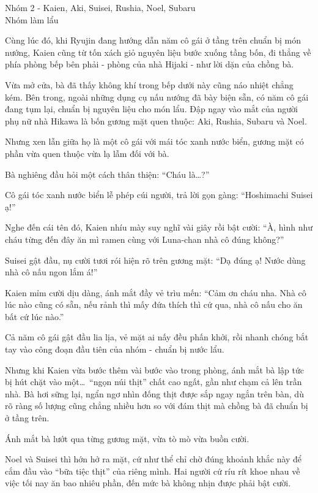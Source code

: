 \documentclass[../main.tex]{subfiles}
\begin{document}
\begin{center}
    {\color{T2} Nhóm 2 - Kaien, Aki, Suisei, Rushia, Noel, Subaru\\Nhóm làm lẩu}
\end{center}

Cùng lúc đó, khi Ryujin đang hướng dẫn năm cô gái ở tầng trên chuẩn bị món nướng, Kaien cũng từ tốn xách giỏ nguyên liệu bước xuống tầng bốn, đi thẳng về phía phòng bếp bên phải - phòng của nhà Hijaki - như lời dặn của chồng bà.

Vừa mở cửa, bà đã thấy không khí trong bếp dưới này cũng náo nhiệt chẳng kém. Bên trong, ngoài những dụng cụ nấu nướng đã bày biện sẵn, có năm cô gái đang tụm lại, chuẩn bị nguyên liệu cho món lẩu. Đập ngay vào mắt của người phụ nữ nhà Hikawa là bốn gương mặt quen thuộc: Aki, Rushia, Subaru và Noel.

Nhưng xen lẫn giữa họ là một cô gái với mái tóc xanh nước biển, gương mặt có phần vừa quen thuộc vừa lạ lẫm đối với bà.

Bà nghiêng đầu hỏi một cách thân thiện: ``Cháu là\dots?''

Cô gái tóc xanh nước biển lễ phép cúi người, trả lời gọn gàng: ``Hoshimachi Suisei ạ!''

Nghe đến cái tên đó, Kaien nhíu mày suy nghĩ vài giây rồi bật cười: ``À, hình như cháu từng đến đây ăn mì ramen cùng với Luna-chan nhà cô  đúng không?''

Suisei gật đầu, nụ cười tươi rói hiện rõ trên gương mặt: ``Dạ đúng ạ! Nước dùng nhà cô nấu ngon lắm á!''

Kaien mỉm cười dịu dàng, ánh mắt đầy vẻ trìu mến: ``Cảm ơn cháu nha. Nhà cô lúc nào cũng có sẵn, nếu rảnh thì mấy đứa thích thì cứ qua, nhà cô nấu cho ăn bất cứ lúc nào.''

Cả năm cô gái gật đầu lia lịa, vẻ mặt ai nấy đều phấn khởi, rồi nhanh chóng bắt tay vào công đoạn đầu tiên của nhóm - chuẩn bị nước lẩu.

Nhưng khi Kaien vừa bước thêm vài bước vào trong phòng, ánh mắt bà lập tức bị hút chặt vào một\dots\ ``ngọn núi thịt'' chất cao ngất, gần như chạm cả lên trần nhà. Bà hơi sững lại, ngẩn ngơ nhìn đống thịt được sắp ngay ngắn trên bàn, dù rõ ràng số lượng cũng chẳng nhiều hơn so với đám thịt mà chồng bà đã chuẩn bị ở tầng trên.

Ánh mắt bà lướt qua từng gương mặt, vừa tò mò vừa buồn cười.

Noel và Suisei thì hớn hở ra mặt, cứ như thể chỉ chờ đúng khoảnh khắc này để cắm đầu vào ``bữa tiệc thịt'' của riêng mình. Hai người cứ ríu rít khoe nhau về việc tối nay ăn bao nhiêu phần, đến mức bà không nhịn được phải bật cười.
\end{document}
